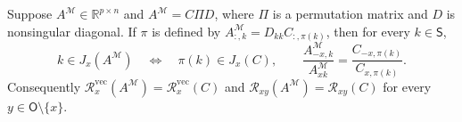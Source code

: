 Suppose \(A^{\mathcal M}\in\mathbb R^{p\times n}\) and \(A^{\mathcal M}=C\Pi D\), where \(\Pi\) is a permutation matrix and \(D\) is nonsingular diagonal. If \(\pi\) is defined by \(A^{\mathcal M}_{:,k}=D_{kk}C_{:,\pi(k)}\), then for every \(k\in\mathsf S\),
\[
k\in J_x(A^{\mathcal M})\quad\Longleftrightarrow\quad \pi(k)\in J_x(C),
\qquad
\frac{A^{\mathcal M}_{-x,k}}{A^{\mathcal M}_{xk}}
=\frac{C_{-x,\pi(k)}}{C_{x,\pi(k)}}.
\]
Consequently \(\mathcal R_x^{\mathrm{vec}}(A^{\mathcal M})=\mathcal R_x^{\mathrm{vec}}(C)\) and \(\mathcal R_{xy}(A^{\mathcal M})=\mathcal R_{xy}(C)\) for every \(y\in\mathsf O\setminus\{x\}\).